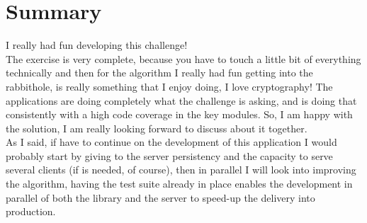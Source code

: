 \documentclass[11pt]{article}
\begin{document}
\section{Summary}
\label{sec:org2246cff}
I really had fun developing this challenge!\\[0pt]
The exercise is very complete, because you have to touch a little bit of everything technically and then for the algorithm I really had fun getting into the rabbithole, is really something that I enjoy doing, I love cryptography!
The applications are doing completely what the challenge is asking, and is doing that consistently with a high code coverage in the key modules. So, I am happy with the solution, I am really looking forward to discuss about it together.\\[0pt]
As I said, if have to continue on the development of this application I would probably start by giving to the server persistency and the capacity to serve several clients (if is needed, of course), then in parallel I will look into improving the algorithm, having the test suite already in place enables the development in parallel of both the library and the server to speed-up the delivery into production.
\end{document}
